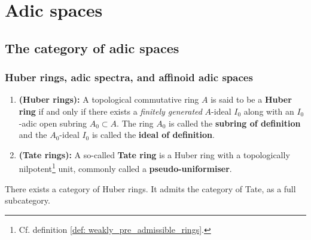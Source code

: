 \section{Adic spaces}
    \subsection{The category of adic spaces}
        \subsubsection{Huber rings, adic spectra, and affinoid adic spaces}
            \begin{definition} \label{def: huber_rings_and_tate_rings}
                \noindent
                \begin{enumerate}
                    \item \textbf{(Huber rings):} A topological commutative ring $A$ is said to be a \textbf{Huber ring} if and only if there exists a \textit{finitely generated} $A$-ideal $I_0$ along with an $I_0$-adic open subring $A_0 \subset A$. The ring $A_0$ is called the \textbf{subring of definition} and the $A_0$-ideal $I_0$ is called the \textbf{ideal of definition}.
                    \item \textbf{(Tate rings):} A so-called \textbf{Tate ring} is a Huber ring with a topologically nilpotent\footnote{Cf. definition \ref{def: weakly_pre_admissible_rings}.} unit, commonly called a \textbf{pseudo-uniformiser}. 
                \end{enumerate}
            \end{definition}
            \begin{proposition} \label{prop: morphisms_of_huber_rings}
                There exists a category of Huber rings. It admits the category of Tate, as a full subcategory.
            \end{proposition}
